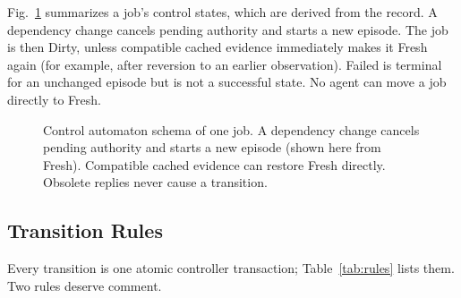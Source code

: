 \documentclass[10pt,journal,compsoc]{IEEEtran}
\theoremstyle{plain}
\theoremstyle{definition}
\begin{document}
Fig.~\ref{fig:automaton} summarizes a job's control states, which are derived from the record. A dependency change cancels pending authority and starts a new episode. The job is then Dirty, unless compatible cached evidence immediately makes it Fresh again (for example, after reversion to an earlier observation). Failed is terminal for an unchanged episode but is not a successful state. No agent can move a job directly to Fresh.

\begin{figure}[!t]
\centering
{}%
\caption{Control automaton schema of one job. A dependency change cancels pending authority and starts a new episode (shown here from Fresh). Compatible cached evidence can restore Fresh directly. Obsolete replies never cause a transition.}\label{fig:automaton}
\end{figure}

\subsection{Transition Rules}\label{sec:rules}
Every transition is one atomic controller transaction; Table~\ref{tab:rules} lists them. Two rules deserve comment.
\end{document}

